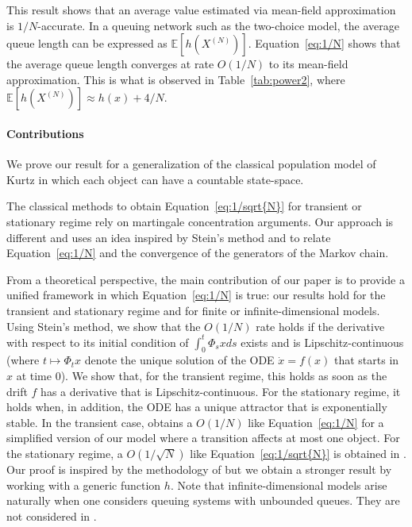 \documentclass[sigconf]{acmart}
\newcommand\XN{X^{(N)}}
\newcommand\sesp[1]{\mathbb{E}[#1]}
\begin{document}
This result shows that an average value estimated via mean-field
approximation is $1/N$-accurate.  In a queuing network such as the
two-choice model, the average queue length can be expressed as
$\sesp{h(\XN)}$.  Equation~\eqref{eq:1/N} shows that the average queue
length converges at rate $O(1/N)$ to its mean-field approximation.
This is what is observed in Table~\ref{tab:power2}, where 
$\sesp{h(\XN)}\approx h(x)+4/N$.

\paragraph*{Contributions}
We prove our result for a generalization of the classical population
model of Kurtz in which each object can have a countable
state-space.

The classical methods to obtain Equation~\eqref{eq:1/sqrt{N}} for
transient \cite{benaim2008class,kurtz70} or stationary regime
\cite{bortolussi2013bounds} rely on martingale concentration
arguments.  Our approach is different and uses an idea inspired by
Stein's method and
\cite{kolokoltsov2011mean,stein1986approximate,ying2016rate} to relate
Equation~\eqref{eq:1/N} and the convergence of the generators of the
Markov chain.  

From a theoretical perspective, the main contribution of our paper is
to provide a unified framework in which Equation~\eqref{eq:1/N} is
true: our results hold for the transient and stationary regime and for
finite or infinite-dimensional models.  Using Stein's method, we show
that the $O(1/N)$ rate holds if the derivative with respect to its
initial condition of $\int_0^t\Phi_sxds$ exists and is
Lipschitz-continuous (where $t\mapsto\Phi_tx$ denote the unique
solution of the ODE $\dot{x}=f(x)$ that starts in $x$ at time $0$).
We show that, for the transient regime, this holds as soon as the
drift $f$ has a derivative that is Lipschitz-continuous. For the
stationary regime, it holds when, in addition, the ODE has a unique
attractor that is exponentially stable.  In the transient case,
\cite{kolokoltsov2011mean} obtains a $O(1/N)$ like
Equation~\eqref{eq:1/N} for a simplified version of our model where a
transition affects at most one object.  For the stationary regime, a
$O(1/\sqrt{N})$ like Equation~\eqref{eq:1/sqrt{N}} is obtained in
\cite{ying2016rate}. Our proof is inspired by the methodology of
\cite{ying2016rate} but we obtain a stronger result by working with a
generic function $h$.  Note that infinite-dimensional models arise
naturally when one considers queuing systems with unbounded
queues. They are not considered in
\cite{kolokoltsov2011mean,ying2016rate}.
\end{document}
